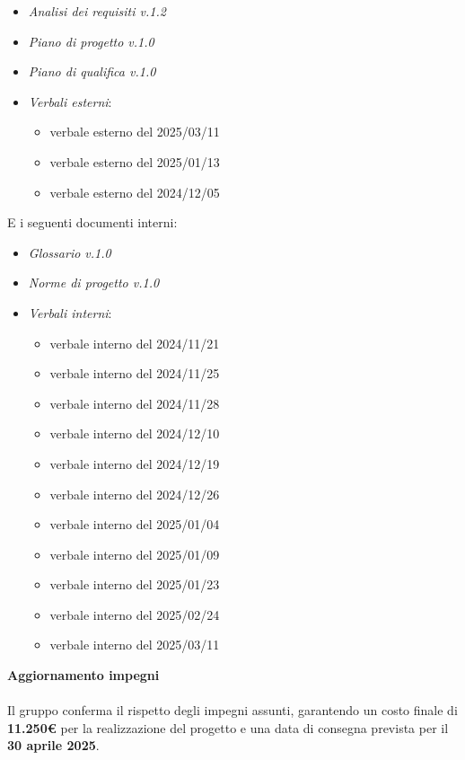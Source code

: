 \documentclass[a4paper, 12pt]{article}
\begin{document}
\begin{itemize}
    \item \textit{Analisi dei requisiti v.1.2}
    \item \textit{Piano di progetto v.1.0}
    \item \textit{Piano di qualifica v.1.0}
    \item \textit{Verbali esterni}:
    \begin{itemize}
        \item verbale esterno del 2025/03/11
        \item verbale esterno del 2025/01/13
        \item verbale esterno del 2024/12/05
    \end{itemize}
\end{itemize}
\noindent
E i seguenti documenti interni:
\begin{itemize}
    \item \textit{Glossario v.1.0}
    \item \textit{Norme di progetto v.1.0}
    \item \textit{Verbali interni}:
    \begin{itemize}
        \item verbale interno del 2024/11/21
        \item verbale interno del 2024/11/25
        \item verbale interno del 2024/11/28
        \item verbale interno del 2024/12/10
        \item verbale interno del 2024/12/19
        \item verbale interno del 2024/12/26
        \item verbale interno del 2025/01/04
        \item verbale interno del 2025/01/09
        \item verbale interno del 2025/01/23
        \item verbale interno del 2025/02/24
        \item verbale interno del 2025/03/11
    \end{itemize}
\end{itemize}
\vspace{0.75cm} 
\noindent
\textbf{Aggiornamento impegni}\\
\\
Il gruppo conferma il rispetto degli impegni assunti, garantendo un costo finale di \textbf{11.250€} per la realizzazione del progetto e una data di consegna prevista per il \textbf{30 aprile 2025}.
\end{document}
